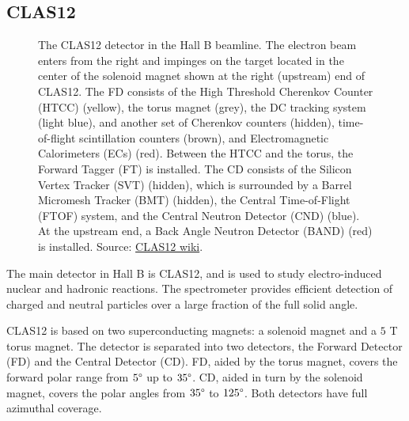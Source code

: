 \subsection{CLAS12} \label{ssec::clas12}
    \begin{figure}[b!]
        \centering{}
        \caption[CLAS12.]{The CLAS12 detector in the Hall B beamline.
        The electron beam enters from the right and impinges on the target located in the center of the solenoid magnet shown at the right (upstream) end of CLAS12.
        The FD consists of the High Threshold Cherenkov Counter (HTCC) (yellow), the torus magnet (grey), the DC tracking system (light blue), and another set of Cherenkov counters (hidden), time-of-flight scintillation counters (brown), and Electromagnetic Calorimeters (ECs) (red).
        Between the HTCC and the torus, the Forward Tagger (FT) is installed.
        The CD consists of the Silicon Vertex Tracker (SVT) (hidden), which is surrounded by a Barrel Micromesh Tracker (BMT) (hidden), the Central Time-of-Flight (FTOF) system, and the Central Neutron Detector (CND) (blue).
        At the upstream end, a Back Angle Neutron Detector (BAND) (red) is installed.
        Source: \hyperlink{https://www.jlab.org/physics/hall-b/clas12}{CLAS12 wiki}.}
        \label{fig::clas12_diagram}
    \end{figure}

    The main detector in Hall B is CLAS12, and is used to study electro-induced nuclear and hadronic reactions.
    The spectrometer provides efficient detection of charged and neutral particles over a large fraction of the full solid angle.

    CLAS12 is based on two superconducting magnets: a solenoid magnet and a $5$ T torus magnet.
    The detector is separated into two detectors, the Forward Detector (FD) and the Central Detector (CD).
    FD, aided by the torus magnet, covers the forward polar range from $5\degree$ up to $35\degree$.
    CD, aided in turn by the solenoid magnet, covers the polar angles from $35\degree$ to $125\degree$.
    Both detectors have full azimuthal coverage.

